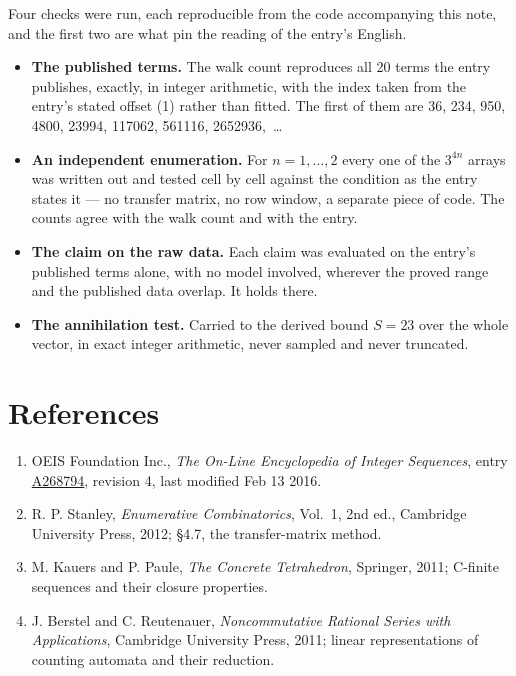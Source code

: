 \documentclass[11pt]{article}
\theoremstyle{definition}
\begin{document}
Four checks were run, each reproducible from the code accompanying this note, and the first two are what pin the reading of the entry's English.

\begin{itemize}

\item {\bfseries The published terms.} The walk count reproduces all 20 terms the entry publishes, exactly, in integer arithmetic, with the index taken from the entry's stated offset (1) rather than fitted. The first of them are 36, 234, 950, 4800, 23994, 117062, 561116, 2652936,~\dots

\item {\bfseries An independent enumeration.} For $n = 1,\dots,2$ every one of the $3^{4n}$ arrays was written out and tested cell by cell against the condition as the entry states it --- no transfer matrix, no row window, a separate piece of code. The counts agree with the walk count and with the entry.

\item {\bfseries The claim on the raw data.} Each claim was evaluated on the entry's published terms alone, with no model involved, wherever the proved range and the published data overlap. It holds there.

\item {\bfseries The annihilation test.} Carried to the derived bound $S = 23$ over the whole vector, in exact integer arithmetic, never sampled and never truncated.

\end{itemize}

\section{References}

\begin{enumerate}

\item OEIS Foundation Inc., \emph{The On-Line Encyclopedia of Integer Sequences}, entry \href{https://oeis.org/A268794}{A268794}, revision 4, last modified Feb 13 2016.

\item R. P. Stanley, \emph{Enumerative Combinatorics}, Vol.~1, 2nd ed., Cambridge University Press, 2012; \S4.7, the transfer-matrix method.

\item M. Kauers and P. Paule, \emph{The Concrete Tetrahedron}, Springer, 2011; C-finite sequences and their closure properties.

\item J. Berstel and C. Reutenauer, \emph{Noncommutative Rational Series with Applications}, Cambridge University Press, 2011; linear representations of counting automata and their reduction.

\end{enumerate}
\end{document}
